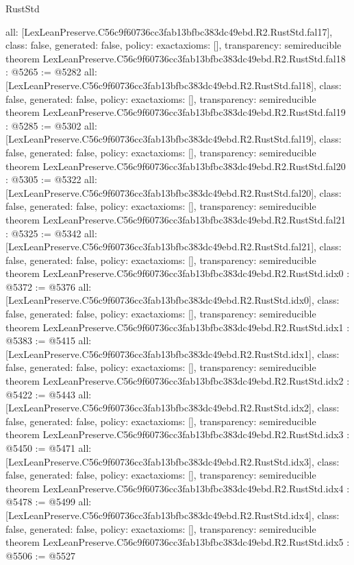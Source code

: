\begin{lexlean}{RustStd}
\begin{coremodule}
{  all: [LexLeanPreserve.C56c9f60736cc3fab13bfbc383dc49ebd.R2.RustStd.fal17],
  class: false,
  generated: false,
  policy: exact{axioms: []},
  transparency: semireducible
}
theorem LexLeanPreserve.C56c9f60736cc3fab13bfbc383dc49ebd.R2.RustStd.fal18 : @5265 := @5282 {
  all: [LexLeanPreserve.C56c9f60736cc3fab13bfbc383dc49ebd.R2.RustStd.fal18],
  class: false,
  generated: false,
  policy: exact{axioms: []},
  transparency: semireducible
}
theorem LexLeanPreserve.C56c9f60736cc3fab13bfbc383dc49ebd.R2.RustStd.fal19 : @5285 := @5302 {
  all: [LexLeanPreserve.C56c9f60736cc3fab13bfbc383dc49ebd.R2.RustStd.fal19],
  class: false,
  generated: false,
  policy: exact{axioms: []},
  transparency: semireducible
}
theorem LexLeanPreserve.C56c9f60736cc3fab13bfbc383dc49ebd.R2.RustStd.fal20 : @5305 := @5322 {
  all: [LexLeanPreserve.C56c9f60736cc3fab13bfbc383dc49ebd.R2.RustStd.fal20],
  class: false,
  generated: false,
  policy: exact{axioms: []},
  transparency: semireducible
}
theorem LexLeanPreserve.C56c9f60736cc3fab13bfbc383dc49ebd.R2.RustStd.fal21 : @5325 := @5342 {
  all: [LexLeanPreserve.C56c9f60736cc3fab13bfbc383dc49ebd.R2.RustStd.fal21],
  class: false,
  generated: false,
  policy: exact{axioms: []},
  transparency: semireducible
}
theorem LexLeanPreserve.C56c9f60736cc3fab13bfbc383dc49ebd.R2.RustStd.idx0 : @5372 := @5376 {
  all: [LexLeanPreserve.C56c9f60736cc3fab13bfbc383dc49ebd.R2.RustStd.idx0],
  class: false,
  generated: false,
  policy: exact{axioms: []},
  transparency: semireducible
}
theorem LexLeanPreserve.C56c9f60736cc3fab13bfbc383dc49ebd.R2.RustStd.idx1 : @5383 := @5415 {
  all: [LexLeanPreserve.C56c9f60736cc3fab13bfbc383dc49ebd.R2.RustStd.idx1],
  class: false,
  generated: false,
  policy: exact{axioms: []},
  transparency: semireducible
}
theorem LexLeanPreserve.C56c9f60736cc3fab13bfbc383dc49ebd.R2.RustStd.idx2 : @5422 := @5443 {
  all: [LexLeanPreserve.C56c9f60736cc3fab13bfbc383dc49ebd.R2.RustStd.idx2],
  class: false,
  generated: false,
  policy: exact{axioms: []},
  transparency: semireducible
}
theorem LexLeanPreserve.C56c9f60736cc3fab13bfbc383dc49ebd.R2.RustStd.idx3 : @5450 := @5471 {
  all: [LexLeanPreserve.C56c9f60736cc3fab13bfbc383dc49ebd.R2.RustStd.idx3],
  class: false,
  generated: false,
  policy: exact{axioms: []},
  transparency: semireducible
}
theorem LexLeanPreserve.C56c9f60736cc3fab13bfbc383dc49ebd.R2.RustStd.idx4 : @5478 := @5499 {
  all: [LexLeanPreserve.C56c9f60736cc3fab13bfbc383dc49ebd.R2.RustStd.idx4],
  class: false,
  generated: false,
  policy: exact{axioms: []},
  transparency: semireducible
}
theorem LexLeanPreserve.C56c9f60736cc3fab13bfbc383dc49ebd.R2.RustStd.idx5 : @5506 := @5527 {
}
\end{coremodule}
\end{lexlean}
